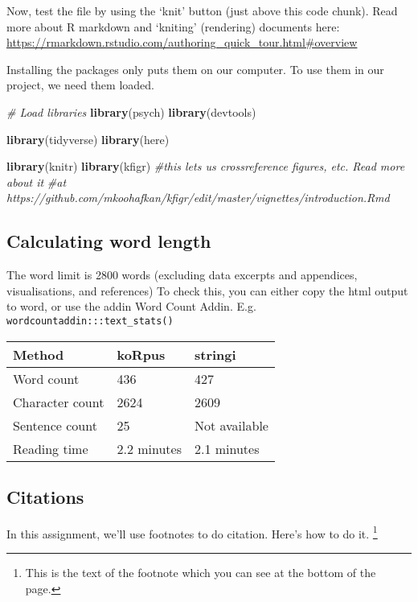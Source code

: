 \documentclass[
]{article}
\newenvironment{Shaded}{\begin{snugshade}}{\end{snugshade}}
\newcommand{\CommentTok}[1]{\textcolor[rgb]{0.56,0.35,0.01}{\textit{#1}}}
\newcommand{\KeywordTok}[1]{\textcolor[rgb]{0.13,0.29,0.53}{\textbf{#1}}}
\newcommand{\NormalTok}[1]{#1}
\begin{document}
Now, test the file by using the `knit' button (just above this code
chunk). Read more about R markdown and `kniting' (rendering) documents
here:
\url{https://rmarkdown.rstudio.com/authoring_quick_tour.html\#overview}

Installing the packages only puts them on our computer. To use them in
our project, we need them loaded.

\begin{Shaded}
\begin{Highlighting}[]
  \CommentTok{# Load libraries}
  \KeywordTok{library}\NormalTok{(psych)}
  \KeywordTok{library}\NormalTok{(devtools)}

  \KeywordTok{library}\NormalTok{(tidyverse)}
  \KeywordTok{library}\NormalTok{(here)}
  
  \KeywordTok{library}\NormalTok{(knitr)}
  \KeywordTok{library}\NormalTok{(kfigr) }\CommentTok{#this lets us crossreference figures, etc. Read more about it }
                \CommentTok{#at https://github.com/mkoohafkan/kfigr/edit/master/vignettes/introduction.Rmd }
\end{Highlighting}
\end{Shaded}

\hypertarget{calculating-word-length}{%
\subsection{Calculating word length}\label{calculating-word-length}}

The word limit is 2800 words (excluding data excerpts and appendices,
visualisations, and references) To check this, you can either copy the
html output to word, or use the addin Word Count Addin. E.g.
\texttt{wordcountaddin:::text\_stats()}

\begin{longtable}[]{@{}lll@{}}
\toprule
Method & koRpus & stringi\tabularnewline
\midrule
\endhead
Word count & 436 & 427\tabularnewline
Character count & 2624 & 2609\tabularnewline
Sentence count & 25 & Not available\tabularnewline
Reading time & 2.2 minutes & 2.1 minutes\tabularnewline
\bottomrule
\end{longtable}

\hypertarget{citations}{%
\subsection{Citations}\label{citations}}

In this assignment, we'll use footnotes to do citation. Here's how to do
it. \footnote{This is the text of the footnote which you can see at the
  bottom of the page.}
\end{document}
